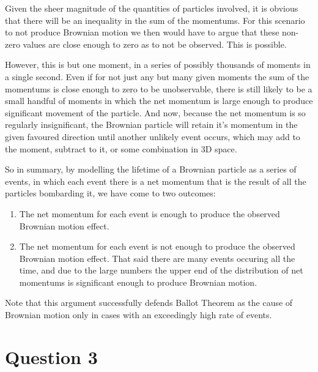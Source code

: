 \documentclass[10pt,a4paper]{article}
\begin{document}
\begin{itemize}
	Given the sheer magnitude of the quantities of particles involved, it is obvious that there will be an inequality in the sum of the momentums. For this scenario to not produce Brownian motion we then would have to argue that these non-zero values are close enough to zero as to not be observed. This is possible.

	However, this is but one moment, in a series of possibly thousands of moments in a single second. Even if for not just any but many given moments the sum of the momentums is close enough to zero to be unobservable, there is still likely to be a small handful of moments in which the net momentum is large enough to produce significant movement of the particle. And now, because the net momentum is so regularly insignificant, the Brownian particle will retain it's momentum in the given favoured direction until another unlikely event occurs, which may add to the moment, subtract to it, or some combination in 3D space.

	So in summary, by modelling the lifetime of a Brownian particle as a series of events, in which each event there is a net momentum that is the result of all the particles bombarding it, we have come to two outcomes:
		\begin{enumerate}
			\item The net momentum for each event is enough to produce the observed Brownian motion effect.
			\item The net momentum for each event is not enough to produce the observed Brownian motion effect. That said there are many events occuring all the time, and due to the large numbers the upper end of the distribution of net momentums is significant enough to produce Brownian motion.
		\end{enumerate}

	Note that this argument successfully defends Ballot Theorem as the cause of Brownian motion only in cases with an exceedingly high rate of events.
\end{itemize}

\section*{Question 3}
\end{document}
